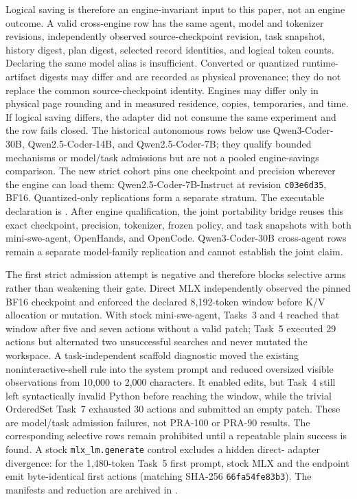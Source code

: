 \documentclass[11pt]{article}
\begin{document}
Logical saving is therefore an engine-invariant input to this paper, not an
engine outcome.  A valid cross-engine row has the same agent, model and
tokenizer revisions, independently observed source-checkpoint revision, task
snapshot, history digest, plan digest, selected record identities, and logical
token counts.  Declaring the same model alias is insufficient.  Converted or
quantized runtime-artifact digests may differ and are recorded as physical
provenance; they do not replace the common source-checkpoint identity.  Engines
may differ only in physical page rounding and in measured residence, copies,
temporaries, and time.  If logical saving differs, the adapter did not consume
the same experiment and the row fails closed.  The historical autonomous rows below use
Qwen3-Coder-30B, Qwen2.5-Coder-14B, and Qwen2.5-Coder-7B; they qualify bounded
mechanisms or model/task admissions but are not a pooled engine-savings
comparison.  The new strict cohort pins one checkpoint and precision wherever
the engine can load them: Qwen2.5-Coder-7B-Instruct at revision
\texttt{c03e6d35}, BF16.  Quantized-only replications form a separate stratum.
The executable declaration is
.
After engine qualification, the joint portability bridge reuses this exact
checkpoint, precision, tokenizer, frozen policy, and task snapshots with both
mini-swe-agent, OpenHands, and OpenCode.  Qwen3-Coder-30B cross-agent rows remain a
separate model-family replication and cannot establish the joint claim.

The first strict admission attempt is negative and therefore blocks selective
arms rather than weakening their gate.  Direct MLX independently observed the
pinned BF16 checkpoint and enforced the declared 8,192-token window before K/V
allocation or mutation.  With stock mini-swe-agent, Tasks~3 and 4 reached that
window after five and seven actions without a valid patch; Task~5 executed 29
actions but alternated two unsuccessful searches and never mutated the
workspace.  A task-independent scaffold diagnostic moved the existing
noninteractive-shell rule into the system prompt and reduced oversized visible
observations from 10,000 to 2,000 characters.  It enabled edits, but Task~4
still left syntactically invalid Python before reaching the window, while the
trivial OrderedSet Task~7 exhausted 30 actions and submitted an empty patch.
These are model/task admission failures, not PRA-100 or PRA-90 results.  The
corresponding selective rows remain prohibited until a repeatable plain success
is found.  A stock \texttt{mlx\_lm.generate} control excludes a hidden direct-
adapter divergence: for the 1,480-token Task~5 first prompt, stock MLX and the
endpoint emit byte-identical first actions (matching SHA-256
\texttt{66fa54fe83b3}).  The manifests and reduction are archived in
.
\end{document}
